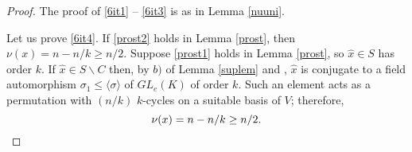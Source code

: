 \begin{proof}

 
The proof of \eqref{6it1} -- \eqref{6it3} is  as in Lemma \ref{nuuni}.

 Let us prove \eqref{6it4}.  If  \eqref{prost2} holds in Lemma \ref{prost}, then $\nu(x)=n-n/k\ge n/2.$ 
Suppose \eqref{prost1} holds in Lemma \ref{prost}, so $\hat{x} \in S$ has order $k.$
 If $\hat{x}  \in S \backslash C$ then, by $b)$ of Lemma \ref{suplem} and \cite[7-2]{conjaut}, $\hat{x}$ is conjugate to a field automorphism $\sigma_1 \le \langle \sigma \rangle$ of $GL_e(K)$ of order $k$.
Such an element acts as a permutation with $(n/k)$ $k$-cycles on a suitable basis of $V$; therefore, 
\begin{equation*}
\nu(x)=n-n/k\ge n/2. \qedhere
\end{equation*} 
%
%




\end{proof}

